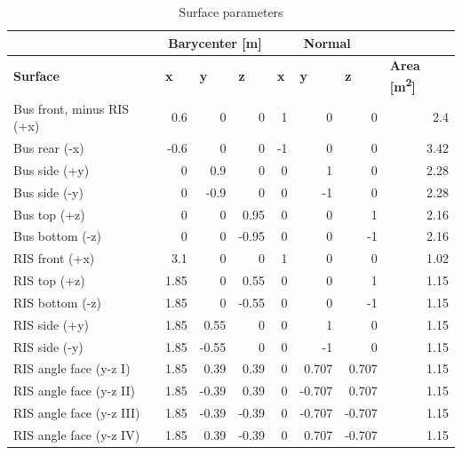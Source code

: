 \begin{longtable}{lrrrrrrr}
\caption{Surface parameters}
\label{tab:surfaces}\\
 &
  \multicolumn{3}{c}{\textbf{Barycenter [m]}} &
  \multicolumn{3}{c}{\textbf{Normal}} &
  \multicolumn{1}{l}{} \\
\endfirsthead
%
\endhead
%
\textbf{Surface} &
  \multicolumn{1}{l}{\textbf{x}} &
  \multicolumn{1}{l}{\textbf{y}} &
  \multicolumn{1}{l}{\textbf{z}} &
  \multicolumn{1}{l}{\textbf{x}} &
  \multicolumn{1}{l}{\textbf{y}} &
  \multicolumn{1}{l}{\textbf{z}} &
  \multicolumn{1}{l}{\textbf{Area [m\textsuperscript{2}]}} \\
Bus front, minus RIS (+x) & 0.6   & 0     & 0     & 1      & 0      & 0      & 2.4   \\
Bus rear (-x)                  & -0.6  & 0     & 0     & -1     & 0      & 0      & 3.42  \\
Bus side (+y)                  & 0     & 0.9   & 0     & 0      & 1      & 0      & 2.28  \\
Bus side (-y)                  & 0     & -0.9  & 0     & 0      & -1     & 0      & 2.28  \\
Bus top (+z)                   & 0     & 0     & 0.95  & 0      & 0      & 1      & 2.16  \\
Bus bottom (-z)                & 0     & 0     & -0.95 & 0      & 0      & -1     & 2.16  \\
RIS front (+x)                 & 3.1   & 0     & 0     & 1      & 0      & 0      & 1.02  \\
RIS top (+z)                   & 1.85  & 0     & 0.55  & 0      & 0      & 1      & 1.15  \\
RIS bottom (-z)                & 1.85  & 0     & -0.55 & 0      & 0      & -1     & 1.15  \\
RIS side (+y)                  & 1.85  & 0.55  & 0     & 0      & 1      & 0      & 1.15  \\
RIS side (-y)                  & 1.85  & -0.55 & 0     & 0      & -1     & 0      & 1.15  \\
RIS angle face (y-z I)         & 1.85  & 0.39  & 0.39  & 0      & 0.707  & 0.707  & 1.15  \\
RIS angle face (y-z II)        & 1.85  & -0.39 & 0.39  & 0      & -0.707 & 0.707  & 1.15  \\
RIS angle face (y-z III)       & 1.85  & -0.39 & -0.39 & 0      & -0.707 & -0.707 & 1.15  \\
RIS angle face (y-z IV)        & 1.85  & 0.39  & -0.39 & 0      & 0.707  & -0.707 & 1.15  \\

\end{longtable}
